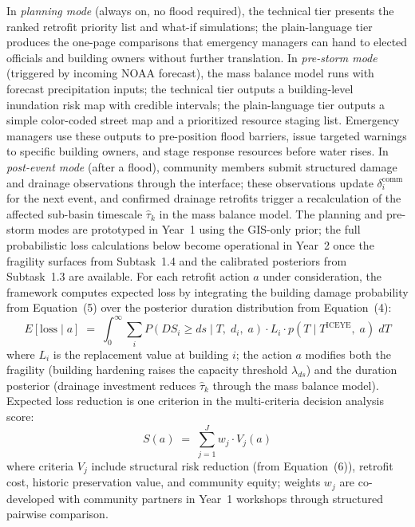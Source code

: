 \documentclass[11pt]{article}
\begin{document}
In \textit{planning mode} (always on, no flood required), the technical tier presents
the ranked retrofit priority list and what-if simulations; the plain-language tier
produces the one-page comparisons that emergency managers can hand to elected
officials and building owners without further translation.
In \textit{pre-storm mode} (triggered by incoming NOAA forecast), the mass balance
model runs with forecast precipitation inputs; the technical tier outputs a
building-level inundation risk map with credible intervals; the plain-language tier
outputs a simple color-coded street map and a prioritized resource staging list.
Emergency managers use these outputs to pre-position flood barriers, issue targeted
warnings to specific building owners, and stage response resources before water rises.
In \textit{post-event mode} (after a flood), community members submit structured
damage and drainage observations through the interface; these observations update
$\delta_i^{\mathrm{comm}}$ for the next event, and confirmed drainage retrofits
trigger a recalculation of the affected sub-basin timescale $\hat{\tau}_k$ in the
mass balance model.
The planning and pre-storm modes are prototyped in Year~1 using the GIS-only
prior; the full probabilistic loss calculations below become operational in
Year~2 once the fragility surfaces from Subtask~1.4 and the calibrated posteriors
from Subtask~1.3 are available.
For each retrofit action $a$ under consideration, the framework computes expected
loss by integrating the building damage probability from Equation~(5) over the
posterior duration distribution from Equation~(4):
\begin{equation}
  E[\text{loss} \mid a] \;=\;
  \int_0^\infty \sum_{i}
    P(DS_i \geq ds \mid T,\; d_i,\; a)\cdot L_i
    \cdot p(T \mid T^{\mathrm{ICEYE}},\; a)\; dT
\end{equation}
where $L_i$ is the replacement value at building $i$; the action $a$ modifies both
the fragility (building hardening raises the capacity threshold $\lambda_{ds}$)
and the duration posterior (drainage investment reduces $\hat{\tau}_k$ through
the mass balance model).
Expected loss reduction is one criterion in the multi-criteria decision analysis
score:
\begin{equation}
  S(a) \;=\; \sum_{j=1}^{J} w_j \cdot V_j(a)
\end{equation}
where criteria $V_j$ include structural risk reduction (from Equation~(6)), retrofit
cost, historic preservation value, and community equity; weights $w_j$ are
co-developed with community partners in Year~1 workshops through structured pairwise
comparison.
\end{document}
